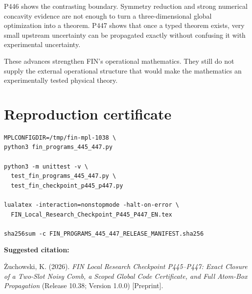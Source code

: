 \documentclass[11pt,a4paper,openany]{report}
\begin{document}
P446 shows the contrasting boundary. Symmetry reduction and strong numerical concavity evidence are not enough to turn a three-dimensional global optimization into a theorem. P447 shows that once a typed theorem exists, very small upstream uncertainty can be propagated exactly without confusing it with experimental uncertainty.

These advances strengthen FIN's operational mathematics. They still do not supply the external operational structure that would make the mathematics an experimentally tested physical theory.


\clearpage
\chapter*{Reproduction certificate}
\begin{Verbatim}[fontsize=\small]
MPLCONFIGDIR=/tmp/fin-mpl-1038 \
python3 fin_programs_445_447.py

python3 -m unittest -v \
  test_fin_programs_445_447.py \
  test_fin_checkpoint_p445_p447.py

lualatex -interaction=nonstopmode -halt-on-error \
  FIN_Local_Research_Checkpoint_P445_P447_EN.tex

sha256sum -c FIN_PROGRAMS_445_447_RELEASE_MANIFEST.sha256
\end{Verbatim}

\noindent\textbf{Suggested citation:}

\.Zuchowski, K. (2026). \emph{FIN Local Research Checkpoint P445--P447:
Exact Closure of a Two-Slot Noisy Comb, a Scoped Global Code Certificate,
and Full Atom-Box Propagation} (Release 10.38; Version 1.0.0) [Preprint].
\end{document}
